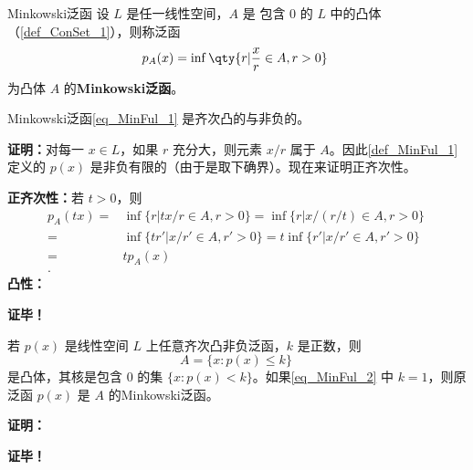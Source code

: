 

\begin{definition}{Minkowski泛函}\label{def_MinFul_1}
设 $L$ 是任一线性空间，$A$ 是 包含 0 的 $L$ 中的凸体（\autoref{def_ConSet_1}），则称泛函
\begin{equation}\label{eq_MinFul_1}
p_A(x)=\inf\qty{r|\frac{x}{r}\in A,r>0}~
\end{equation}
为凸体 $A$ 的\textbf{Minkowski泛函}。

\end{definition}


\begin{theorem}{}
Minkowski泛函\autoref{eq_MinFul_1} 是齐次凸的与非负的。
\end{theorem}

\textbf{证明：}对每一 $x\in L$，如果 $r$ 充分大，则元素 $x/r$ 属于 $A$。因此\autoref{def_MinFul_1} 定义的 $p(x)$ 是非负有限的（由于是取下确界）。现在来证明正齐次性。

\textbf{正齐次性：}若 $t>0$，则
\begin{equation}
\begin{aligned}
p_A(tx)=&\inf \{r|tx/r\in A,r>0\}=\inf \{r|x/(r/t)\in A,r>0\}\\
=&\inf \{tr'|x/r'\in A,r'>0\}=t\inf \{r'|x/r'\in A,r'>0\}\\
=&tp_A(x)\\.
\end{aligned}~
\end{equation}
\textbf{凸性：}




\textbf{证毕！}

\begin{theorem}{}
若 $p(x)$ 是线性空间 $L$ 上任意齐次凸非负泛函，$k$ 是正数，则
\begin{equation}\label{eq_MinFul_2}
A=\{x:p(x)\leq k\}~
\end{equation}
是凸体，其核是包含 $0$ 的集 $\{x:p(x)<k\}$。如果\autoref{eq_MinFul_2} 中 $k=1$，则原泛函 $p(x)$ 是 $A$ 的Minkowski泛函。
\end{theorem}

\textbf{证明：}




\textbf{证毕！}

